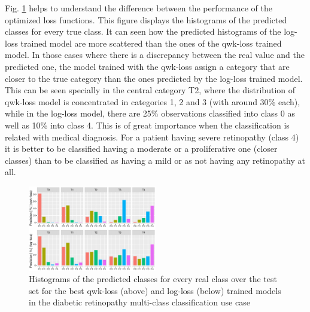 \documentclass[times,twocolumn,final,authoryear]{elsarticle}
\begin{document}
Fig. \ref{fig:confusion-retine} helps to understand the difference between the performance of the optimized loss functions. This figure displays the histograms of the predicted classes for every true class. It can seen how the predicted histograms of the log-loss trained model are more scattered than the ones of the qwk-loss trained model. In those cases where there is a discrepancy between the real value and the predicted one, the model trained with the qwk-loss assign a category that are closer to the true category than the ones predicted by the log-loss trained model. This can be seen specially in the central category T2, where the distribution of qwk-loss model is concentrated in categories 1, 2 and 3 (with around 30\% each), while in the log-loss model, there are 25\% observations classified into class 0 as well as 10\% into class 4. This is of great importance when the classification is related with medical diagnosis. For a patient having severe retinopathy (class 4) it is better to be classified having a moderate or a proliferative one (closer classes) than to be classified as having a mild or as not having any retinopathy at all.

\begin{figure}[!htb]
	\centering
	\includegraphics[width=0.5\textwidth]{./graphs/confusion-retine.eps}
	\caption{Histograms of the predicted classes for every real class over the test set for the best qwk-loss (above) and log-loss (below) trained models in the diabetic retinopathy multi-class classification use case}
	\label{fig:confusion-retine}
\end{figure}
 
\end{document}
